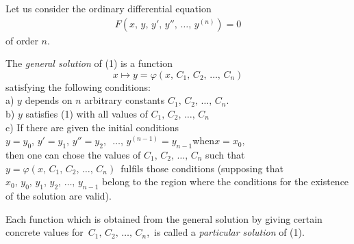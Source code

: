 \documentclass[12pt]{article}
\theoremstyle{definition}
\begin{document}
Let us consider the ordinary differential equation
\begin{align}
  F(x,\,y,\,y',\,y'',\,\ldots,\,y^{(n)}) = 0
\end{align}
of order $n$.

The {\em general solution} of (1) is a function 
$$x\mapsto y = \varphi(x,\,C_1,\,C_2,\,\ldots,\,C_n)$$
satisfying the following conditions:\\

a) $y$ depends on $n$ arbitrary constants $C_1,\,C_2,\,\ldots,\,C_n$.\\
b) $y$ satisfies (1) with all values of $C_1,\,C_2,\,\ldots,\,C_n$\\
c) If there are given the initial conditions\\
\qquad\qquad $y = y_0$,\,\,$y' = y_1$,\,\,$y'' = y_2$,\,\,
$\ldots$,\,\,$y^{(n-1)} = y_{n-1}$\quad when\quad$x = x_0,$\\
then one can chose the values of $C_1,\,C_2,\,\ldots,\,C_n$ such that\, 
$y = \varphi(x,\,C_1,\,C_2,\,\ldots,\,C_n)$\, fulfils those conditions (supposing that $x_0,\,y_0,\,y_1,\,y_2,\,\ldots,\,y_{n-1}$ belong to the region where the conditions for the existence of the solution are valid).

Each function which is obtained from the general solution by giving certain concrete values for\, $C_1,\,C_2,\,\ldots,\,C_n$,\, is called a {\em particular solution} of (1).
\end{document}
